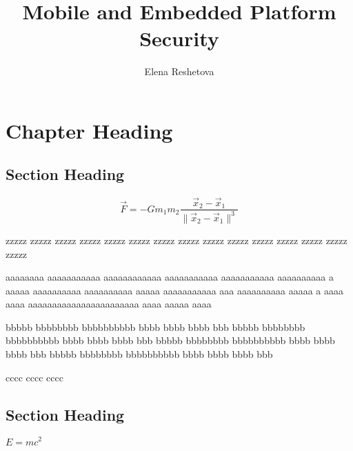 \documentclass[dissertation,math,vertlayout]{aaltoseries}
\author{Elena Reshetova}
\title{Mobile and Embedded Platform Security}
\begin{document}
\draftabstract{\lipsum[1-3]}
\draftabstract[finnish]{\lipsum[4-6]}

\begin{preface}[Sipoo]
\lipsum[1-4]
\end{preface}

\clearpage
\tableofcontents


\listofpublications



\chapter{Chapter Heading}
\section{Section Heading}
\[
\vec{F}=-G m_1 m_2 \frac{\vec{x}_2-\vec{x}_1}{\lVert{\vec{x}_2-\vec{x}_1}\rVert^3}
\]
\lipsum[1-4]
\cite{Knuth1984:The-TeXbook}


zzzzz zzzzz zzzzz zzzzz zzzzz zzzzz zzzzz zzzzz zzzzz 
zzzzz zzzzz zzzzz zzzzz zzzzz zzzzz 
\begin{quoting}
aaaaaaaa aaaaaaaaaaa aaaaaaaaaaaa aaaaaaaaaaa aaaaaaaaaaa aaaaaaaaaa a aaaaa
aaaaaaaaaa aaaaaaaaaa aaaaa aaaaaaaaaaa aaa aaaaaaaaaa aaaaa a aaaa aaaa
aaaaaaaaaaaaaaaaaaaaaaa aaaa aaaaa aaaa

bbbbb bbbbbbbb bbbbbbbbbb bbbb bbbb bbbb bbb bbbbb bbbbbbbb 
bbbbbbbbbb bbbb bbbb bbbb bbb bbbbb bbbbbbbb bbbbbbbbbb bbbb bbbb 
bbbb bbb bbbbb bbbbbbbb bbbbbbbbbb bbbb bbbb bbbb bbb 
\end{quoting}
cccc cccc cccc

\section{Section Heading}
$E=mc^2$
\lipsum[5-6]
%
\cite{WikiBooks2008:LaTeX}
\end{document}
